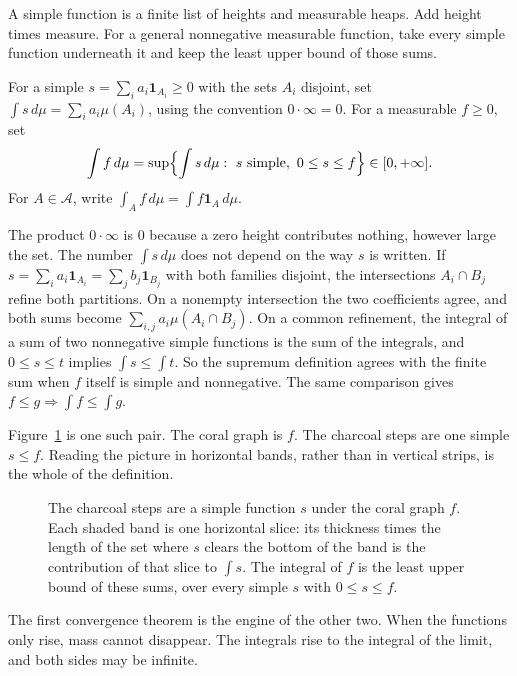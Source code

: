 A simple function is a finite list of heights and measurable heaps. Add height times measure. For a general nonnegative measurable function, take every simple function underneath it and keep the least upper bound of those sums.

\begin{definition}
For a simple \(s=\sum_ia_i\mathbf 1_{A_i}\ge0\) with the sets \(A_i\) disjoint, set \(\int s\,d\mu=\sum_ia_i\mu(A_i)\), using the convention \(0\cdot\infty=0\). For a measurable \(f\ge0\), set
\[\int f\,d\mu=\sup\Bigl\{\int s\,d\mu:\ s\text{ simple},\ 0\le s\le f\Bigr\}\in[0,+\infty].\]
For \(A\in\mathcal A\), write \(\int_Af\,d\mu=\int f\mathbf 1_A\,d\mu\).
\end{definition}

The product \(0\cdot\infty\) is \(0\) because a zero height contributes nothing, however large the set. The number \(\int s\,d\mu\) does not depend on the way \(s\) is written. If \(s=\sum_ia_i\mathbf 1_{A_i}=\sum_jb_j\mathbf 1_{B_j}\) with both families disjoint, the intersections \(A_i\cap B_j\) refine both partitions. On a nonempty intersection the two coefficients agree, and both sums become \(\sum_{i,j}a_i\mu(A_i\cap B_j)\). On a common refinement, the integral of a sum of two nonnegative simple functions is the sum of the integrals, and \(0\le s\le t\) implies \(\int s\le\int t\). So the supremum definition agrees with the finite sum when \(f\) itself is simple and nonnegative. The same comparison gives \(f\le g\Rightarrow\int f\le\int g\).

Figure~\ref{fig:v7c08slices} is one such pair. The coral graph is \(f\). The charcoal steps are one simple \(s\le f\). Reading the picture in horizontal bands, rather than in vertical strips, is the whole of the definition.

\begin{figure}[ht]
\centering
{}
\caption{The charcoal steps are a simple function \(s\) under the coral graph \(f\). Each shaded band is one horizontal slice: its thickness times the length of the set where \(s\) clears the bottom of the band is the contribution of that slice to \(\int s\). The integral of \(f\) is the least upper bound of these sums, over every simple \(s\) with \(0\le s\le f\).}
\label{fig:v7c08slices}
\end{figure}

The first convergence theorem is the engine of the other two. When the functions only rise, mass cannot disappear. The integrals rise to the integral of the limit, and both sides may be infinite.

